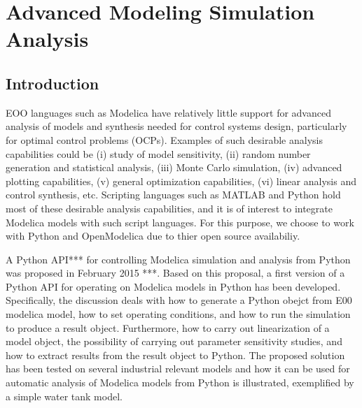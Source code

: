 

\chapter{Advanced Modeling Simulation Analysis}
\label{cha:python}


\section{Introduction}
\label{sec:pythonintroduction}

EOO languages such as Modelica have relatively little support for advanced analysis of models and synthesis needed for control systems design, particularly for optimal control problems (OCPs). Examples of such desirable analysis capabilities could be (i) study of model sensitivity, (ii) random number generation and statistical analysis, (iii) Monte Carlo simulation, (iv) advanced plotting capabilities, (v) general optimization capabilities, (vi) linear analysis and control synthesis, etc. Scripting languages such as MATLAB and Python hold most of these desirable analysis capabilities, and it is of interest to integrate Modelica models with such script languages. For this purpose, we choose to work with Python and OpenModelica due to thier open source availabiliy.

A Python API*** for controlling Modelica simulation and analysis from Python was proposed in February 2015 ***. Based on this proposal, a first version of a Python API for operating on Modelica models in Python has been developed. Specifically, the discussion deals with how to generate a Python obejct from E00 modelica model, how to set operating conditions, and how to run the simulation to produce a result object. Furthermore, how to carry out linearization of a model object, the possibility of carrying out parameter sensitivity studies, and how to extract results from the result object to Python.  The proposed solution has been tested on several industrial relevant models and how it can be used for automatic analysis of Modelica models from Python is illustrated, exemplified by a simple water tank model.

